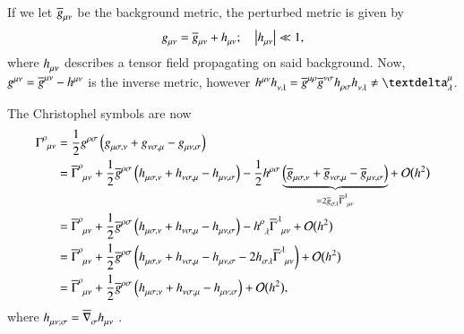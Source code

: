 



If we let $\widebar{g}\lo{\mu\nu}$ be the background metric, the perturbed metric is given by
\begin{equation}
    g\lo{\mu\nu} = \widebar{g}\lo{\mu\nu} + h\lo{\mu\nu}; \quad \abs{h\lo{\mu\nu}} \ll 1,
\end{equation}
where $h\lo{\mu\nu}$ describes a tensor field propagating on said background. %
Now, $g\up{\mu\nu} = \widebar{g}\up{\mu\nu} - h\up{\mu\nu}$ is the inverse metric, however $h\up{\mu\nu}h\lo{\nu\lambda}  = \widebar{g}\up{\mu\rho} \widebar{g}\up{\nu\sigma} h\lo{\rho\sigma} h\lo{\nu\lambda} \neq \Krondelta{^\mu _{\lambda} }$.




The Christophel symbols are now
\begin{equation}
\begin{split}
    \Gamma\indices{^{\rho}_{\mu\nu}} &=  \frac{1}{2}g\up{\rho \sigma} \pclosed{g\lo{\mu\sigma,\nu} + g\lo{\nu\sigma,\mu} - g\lo{\mu\nu,\sigma}}  \\
    &= \widebar{\Gamma}\indices{^{\rho}_{\mu\nu}} + \frac{1}{2}\widebar{g}\up{\rho\sigma} \pclosed{ h\lo{\mu\sigma,\nu} + h\lo{\nu\sigma,\mu} - h\lo{\mu\nu,\sigma}} - \frac{1}{2}h\up{\rho\sigma} \underbrace{\pclosed{ \widebar{g}\lo{\mu\sigma,\nu} + \widebar{g}\lo{\nu\sigma,\mu} - \widebar{g}\lo{\mu\nu,\sigma}}}_{=2 \widebar{g}\lo{\sigma\lambda} \widebar{\Gamma}\indices{^\lambda _{\mu\nu} }} + ~\BigO{h^2} \\
    &= \widebar{\Gamma}\indices{^{\rho}_{\mu\nu}} + \frac{1}{2}\widebar{g}\up{\rho\sigma} \pclosed{ h\lo{\mu\sigma,\nu} + h\lo{\nu\sigma,\mu} - h\lo{\mu\nu,\sigma}} - h\indices{^\rho _\lambda} \widebar{\Gamma}\indices{^\lambda_{\mu\nu}} + \BigO{h^2} \\
    &= \widebar{\Gamma}\indices{^{\rho}_{\mu\nu}} + \frac{1}{2}\widebar{g}\up{\rho\sigma} \pclosed{ h\lo{\mu\sigma,\nu} + h\lo{\nu\sigma,\mu} - h\lo{\mu\nu,\sigma} - 2h\lo{\sigma\lambda}\widebar{\Gamma}\indices{^\lambda_{\mu\nu}} }  + \BigO{h^2} \\
    &= \widebar{\Gamma}\indices{^{\rho}_{\mu\nu}} + \frac{1}{2}\widebar{g}\up{\rho\sigma} \pclosed{h\lo{\mu\sigma;\nu} + h\lo{\nu\sigma;\mu} - h\lo{\mu\nu;\sigma}} + \BigO{h^2},
\end{split}
\end{equation}
where $h\lo{\mu\nu;\sigma}=\widebar{\nabla}\lo{\sigma}h\lo{\mu\nu}$ . 



